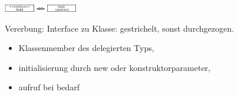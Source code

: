 \includegraphics[width=0.24\textwidth]{abstoint}

Vererbung:  Interface zu Klasse: gestrichelt, sonst durchgezogen.




\begin{itemize}
\item Klassenmember des delegierten Typs, 
\item initialisierung durch new oder konstruktorparameter, 
\item aufruf bei bedarf
\end{itemize}